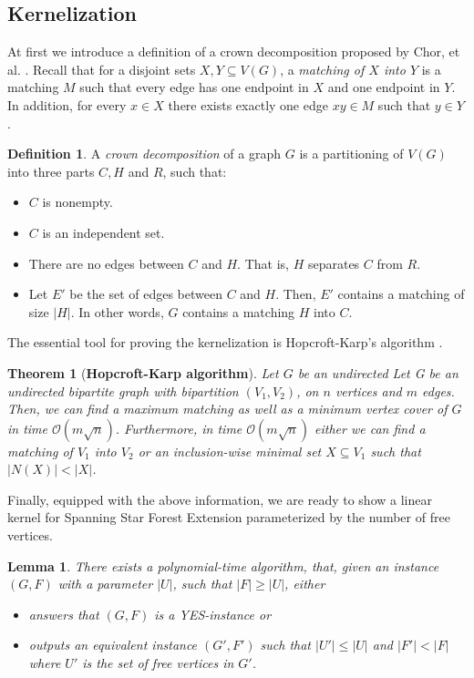 \documentclass[en]{pracamgr}
\newtheorem{theorem}{Theorem}
\newtheorem{lemma}{Lemma}
\theoremstyle{definition}
\newtheorem{definition}{Definition}
\newcommand{\ssfep}{{\sc Spanning Star Forest Extension}}
\begin{document}
\subsection{Kernelization}

At first we introduce a definition of a crown decomposition proposed by Chor, et al. \cite{Crown}. Recall that for a disjoint sets $X,Y \subseteq V(G)$, a \textit{matching of $X$ into $Y$} is a matching $M$ such that every edge has one endpoint in $X$ and one endpoint in $Y$. In addition, for every $x \in X$ there exists exactly one edge $xy \in M$ such that $y \in Y$.

\begin{definition}
	A \textit{crown decomposition} of a graph $G$ is a partitioning of $V(G)$ into three parts $C,H$ and $R$, such that:
	\begin{itemize}
		\item $C$ is nonempty.
		\item $C$ is an independent set.
		\item There are no edges between $C$ and $H$. That is, $H$ separates $C$ from $R$.
		\item Let $E'$ be the set of edges between $C$ and $H$. Then, $E'$ contains a matching of size $|H|$. In other words, $G$ contains a matching $H$ into $C$.
	\end{itemize}
\end{definition}

The essential tool for proving the kernelization is Hopcroft-Karp's algorithm \cite{Hopcroft-Karp}.

\begin{theorem}[\textbf{Hopcroft-Karp algorithm}]
	Let $G$ be an undirected Let G be an undirected bipartite graph with bipartition $(V_1,V_2)$, on $n$ vertices and $m$ edges.	Then, we can find a maximum matching as well as a minimum vertex cover of $G$ in time $\mathcal{O}(m\sqrt{n})$. Furthermore, in time $\mathcal{O}(m\sqrt{n})$ either we can find a matching of $V_1$ into $V_2$ or an inclusion-wise minimal set $X \subseteq V_1$ such that $|N(X)| < |X|$.
\end{theorem}

Finally, equipped with the above information, we are ready to show a linear kernel for \ssfep{}  parameterized by the number of free vertices.

\begin{lemma}\label{kernel-ssfep}
	There exists a polynomial-time algorithm, that, given an instance $(G,F)$ with a parameter $|U|$, such that $|F| \geq |U|$, either
	\begin{itemize}
		\item answers that $(G,F)$ is a YES-instance or
		\item outputs an equivalent instance $(G',F')$ such that $|U'| \leq |U|$ and $|F'| < |F|$ where $U'$ is the set of free vertices in $G'$.
	\end{itemize} 
\end{lemma}
\end{document}
